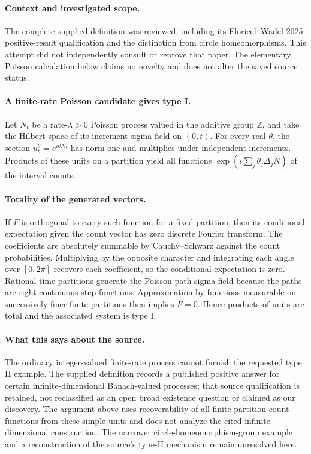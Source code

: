 \documentclass[11pt]{article}
\begin{document}
\paragraph{Context and investigated scope.} The complete supplied definition was reviewed, including its Floricel–Wadel 2025 positive-result qualification and the distinction from circle homeomorphisms. This attempt did not independently consult or reprove that paper. The elementary Poisson calculation below claims no novelty and does not alter the saved source status.

\paragraph{A finite-rate Poisson candidate gives type I.} Let $N_t$ be a rate-$\lambda>0$ Poisson process valued in the additive group $\mathbb Z$, and take the Hilbert space of its increment sigma-field on $(0,t)$. For every real $\theta$, the section $u_t^\theta=e^{i\theta N_t}$ has norm one and multiplies under independent increments. Products of these units on a partition yield all functions $\exp(i\sum_j\theta_j\Delta_jN)$ of the interval counts.

\paragraph{Totality of the generated vectors.} If $F$ is orthogonal to every such function for a fixed partition, then its conditional expectation given the count vector has zero discrete Fourier transform. The coefficients are absolutely summable by Cauchy--Schwarz against the count probabilities. Multiplying by the opposite character and integrating each angle over $[0,2\pi]$ recovers each coefficient, so the conditional expectation is zero. Rational-time partitions generate the Poisson path sigma-field because the paths are right-continuous step functions. Approximation by functions measurable on successively finer finite partitions then implies $F=0$. Hence products of units are total and the associated system is type I.

\paragraph{What this says about the source.} The ordinary integer-valued finite-rate process cannot furnish the requested type II example. The supplied definition records a published positive answer for certain infinite-dimensional Banach-valued processes; that source qualification is retained, not reclassified as an open broad existence question or claimed as our discovery. The argument above uses recoverability of all finite-partition count functions from these simple units and does not analyze the cited infinite-dimensional construction. The narrower circle-homeomorphism-group example and a reconstruction of the source's type-II mechanism remain unresolved here.
\end{document}
